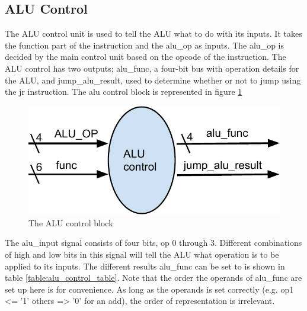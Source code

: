\subsection{ALU Control}

The ALU control unit is used to tell the ALU what to do with its inputs. It takes the function part of the instruction and the alu\_op as inputs. The alu\_op is decided by the main control unit based on the opcode of the instruction. The ALU control has two outputs; alu\_func, a four-bit bus with operation details for the ALU, and jump\_alu\_result, used to determine whether or not to jump using the jr instruction. The alu control block is represented in figure \ref {fig:alu_control_block}

\begin{figure}
	\label{fig:alu_control_block}
	\includegraphics{figures/alu_control}
	\caption{The ALU control block}
\end{figure}

The alu\_input signal consists of four bits, op 0 through 3. Different combinations of high and low bits in this signal will tell the ALU what operation is to be applied to its inputs.  The different results alu\_func can be set to is shown in table \ref{table:alu_control_table}. Note that the order the operands of alu\_func are set up here is for convenience. As long as the operands is set correctly (e.g. op1 <= '1' others => '0' for an add), the order of representation is irrelevant. 

